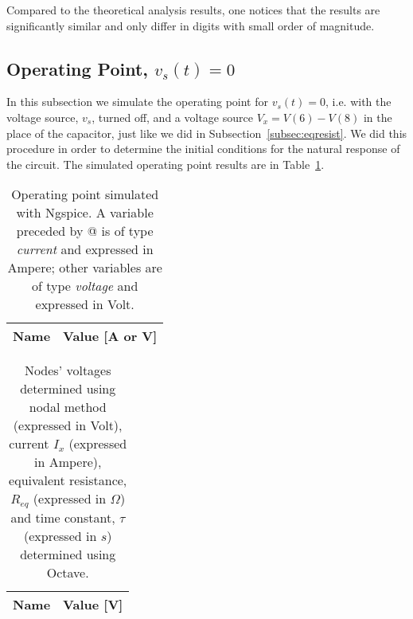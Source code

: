 \vspace{3mm}

Compared to the theoretical analysis results, one notices that the results are significantly similar and only differ in digits with small order of magnitude.

\subsection{Operating Point, $v_s(t)=0$} \label{subsec:op2}

In this subsection we simulate the operating point for $v_s(t)=0$, i.e. with the voltage source, $v_s$, turned off, and a voltage source $V_x=V(6)-V(8)$ in the place of the capacitor, just like we did in Subsection~\ref{subsec:eqresist}. We did this procedure in order to determine the initial conditions for the natural response of the circuit. The simulated operating point results are in Table~\ref{tab:op21}.

\vspace{1mm}

\begin{minipage}[c]{0.5\linewidth}

\begin{table}[H]
  \centering
  \begin{tabular}{|l|r|}
    \hline    
    {\bf Name} & {\bf Value [A or V]} \\ \hline
    
  \end{tabular}
  \caption{Operating point simulated with Ngspice. A variable preceded by @ is of type {\em current} and expressed in Ampere; other variables are of type {\it voltage} and expressed in Volt.}
  \label{tab:op21}
\end{table}

\end{minipage}
\begin{minipage}[c]{0.5\linewidth}

\vspace{24mm}

\begin{table}[H]
  \centering
  \begin{tabular}{|l|r|}
    \hline    
    {\bf Name} & {\bf Value [V]} \\ \hline
    
  \end{tabular}
  \caption{Nodes' voltages determined using nodal method (expressed in Volt), current $I_x$ (expressed in Ampere), equivalent resistance, $R_{eq}$ (expressed in $\Omega$) and time constant, $\tau$ (expressed in $s$) determined using Octave.}
  \label{tab:op22}
\end{table}

\end{minipage}

